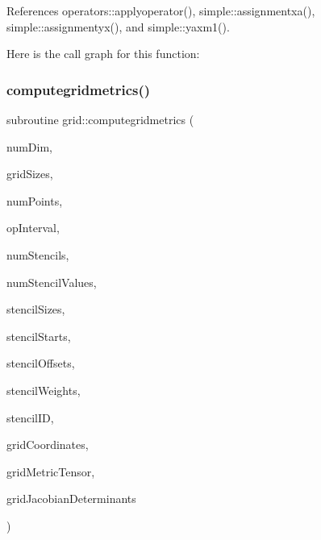 References operators\+::applyoperator(), simple\+::assignmentxa(), simple\+::assignmentyx(), and simple\+::yaxm1().

Here is the call graph for this function\+:
\hypertarget{namespacegrid_aa7be0a201b7b8462fb9c99fde93464c6}{}\label{namespacegrid_aa7be0a201b7b8462fb9c99fde93464c6} 
\subsubsection{\texorpdfstring{computegridmetrics()}{computegridmetrics()}}
{\footnotesize\ttfamily subroutine grid\+::computegridmetrics (\begin{DoxyParamCaption}\item[{integer(kind=4), intent(in)}]{num\+Dim,  }\item[{integer(kind=8), dimension(numdim), intent(in)}]{grid\+Sizes,  }\item[{integer(kind=8), intent(in)}]{num\+Points,  }\item[{integer(kind=8), dimension(2$\ast$numdim), intent(in)}]{op\+Interval,  }\item[{integer(kind=4), intent(in)}]{num\+Stencils,  }\item[{integer(kind=4), intent(in)}]{num\+Stencil\+Values,  }\item[{integer(kind=4), dimension(numstencils), intent(in)}]{stencil\+Sizes,  }\item[{integer(kind=4), dimension(numstencils), intent(in)}]{stencil\+Starts,  }\item[{integer(kind=4), dimension(numstencilvalues), intent(in)}]{stencil\+Offsets,  }\item[{real(kind=8), dimension(numstencilvalues), intent(in)}]{stencil\+Weights,  }\item[{integer(kind=4), dimension(numdim$\ast$numpoints), intent(in), target}]{stencil\+ID,  }\item[{real(kind=8), dimension(numdim$\ast$numpoints), intent(in), target}]{grid\+Coordinates,  }\item[{real(kind=8), dimension(numdim$\ast$numdim$\ast$numpoints), intent(inout), target}]{grid\+Metric\+Tensor,  }\item[{real(kind=8), dimension(2$\ast$numpoints), intent(inout), target}]{grid\+Jacobian\+Determinants }\end{DoxyParamCaption})}



